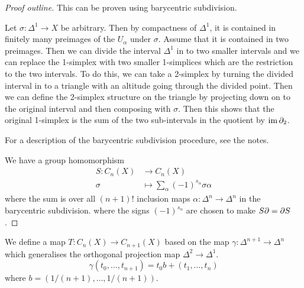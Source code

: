 \begin{proof}[Proof outline]
  This can be proven using barycentric subdivision.
  
  Let $\sigma: \Delta^1 \to X$ be arbitrary.
  Then by compactness of $\Delta^1$, it is contained in finitely many preimages of the $U_\alpha$ under $\sigma$.
  Assume that it is contained in two preimages.
  Then we can divide the interval $\Delta^1$ in to two smaller intervals and we can replace the 1-simplex with two smaller 1-simplices which are the restriction to the two intervals.
  To do this, we can take a 2-simplex by turning the divided interval in to a triangle with an altitude going through the divided point.
  Then we can define the 2-simplex structure on the triangle by projecting down on to the original interval and then composing with $\sigma$.
  Then this shows that the original 1-simplex is the sum of the two sub-intervals in the quotient by $\operatorname{im}\partial_2$.

  For a description of the barycentric subdivision procedure, see the notes.

  We have a group homomorphism
  \begin{align*}
    S: C_n(X) &\to C_n(X) \\
  \sigma &\mapsto \sum_\alpha (-1)^{s_\alpha} \sigma\alpha
  \end{align*}
  where the sum is over all $(n+1)!$ inclusion maps $\alpha: \Delta^n \to \Delta^n$ in the barycentric subdivision.
  where the signs $(-1)^{s_\alpha}$ are chosen to make $S\partial=\partial S$.
\end{proof}

We define a map $T: C_n(X) \to C_{n+1}(X)$ based on the map $\gamma: \Delta^{n+1} \to \Delta^n$ which generalises the orthogonal projection map $\Delta^2 \to \Delta^1$.
\[ \gamma(t_0,\ldots,t_{n+1}) = t_0b + (t_1,\ldots,t_n) \]
where $b = (1/(n+1),\ldots,1/(n+1))$.
